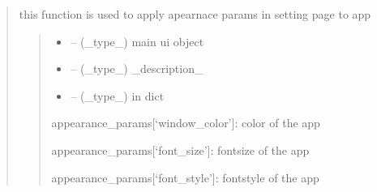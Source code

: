 \documentclass[letterpaper,10pt,english]{sphinxmanual}
\begin{document}
\begin{quote}
\begin{savenotes}\begin{fulllineitems}
\label{\detokenize{setting/backend/mainsetting_funcs:oxin.backend.mainsetting_funcs.apply_appearance_params_to_program}}
\pysigstartsignatures
{}
\pysigstopsignatures
\sphinxAtStartPar
this function is used to apply apearnace params in setting page to app
\begin{quote}\begin{description}
\begin{itemize}
\item {} 
\sphinxAtStartPar
{} – (\_type\_) main ui object

\item {} 
\sphinxAtStartPar
{} – (\_type\_) \_description\_

\item {} 
\sphinxAtStartPar
{} – (\_type\_) in dict

\end{itemize}

\sphinxAtStartPar
appearance\_params{[}‘window\_color’{]}: color of the app

\sphinxAtStartPar
appearance\_params{[}‘font\_size’{]}: font\sphinxhyphen{}size of the app

\sphinxAtStartPar
appearance\_params{[}‘font\_style’{]}: font\sphinxhyphen{}style of the app

\end{description}\end{quote}

\end{fulllineitems}\end{savenotes}



\end{quote}
\end{document}
